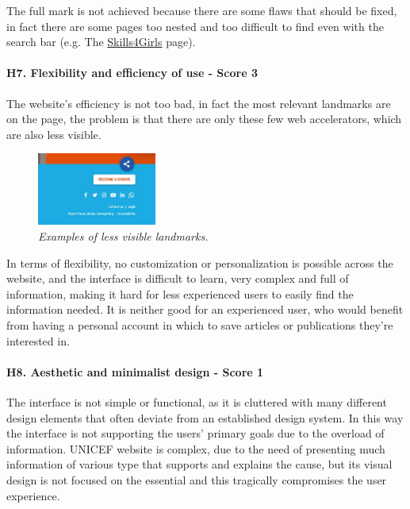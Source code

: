 \newline The full mark is not achieved because there are some flaws that should be fixed, in fact there are some pages too nested and too difficult to find even with the search bar (e.g. The \href{https://www.unicef.org/gender-equality/skills4girls}{Skills4Girls} page).
\newline
\newline \paragraph{H7. Flexibility and efficiency of use - Score 3} \label{subsec:H7}	The website's efficiency is not too bad, in fact the most relevant landmarks are on the page, the problem is that there are only these few web accelerators, which are also less visible.
\begin{figure}[!h]
	\begin{center}
		\includegraphics[width=0.35\textwidth]{FinalScores13.jpg}
		\captionsetup{font=small}
		\caption{\textit{Examples of less visible landmarks.}}
	\end{center}
\end{figure}
\newline In terms of flexibility, no customization or personalization is possible across the website, and the interface is difficult to learn, very complex and full of information, making it hard for less experienced users to easily find the information needed. It is neither good for an experienced user, who would benefit from having a personal account in which to save articles or publications they're interested in.
\newline
\newline \paragraph{H8. Aesthetic and minimalist design - Score 1} \label{subsec:H8}	The interface is not simple or functional, as it is cluttered with many different design elements that often deviate from an established design system. In this way the interface is not supporting the users’ primary goals due to the overload of information.
\newline UNICEF website is complex, due to the need of presenting much information of various type that supports and explains the cause, but its visual design is not focused on the essential and this tragically compromises the user experience.
